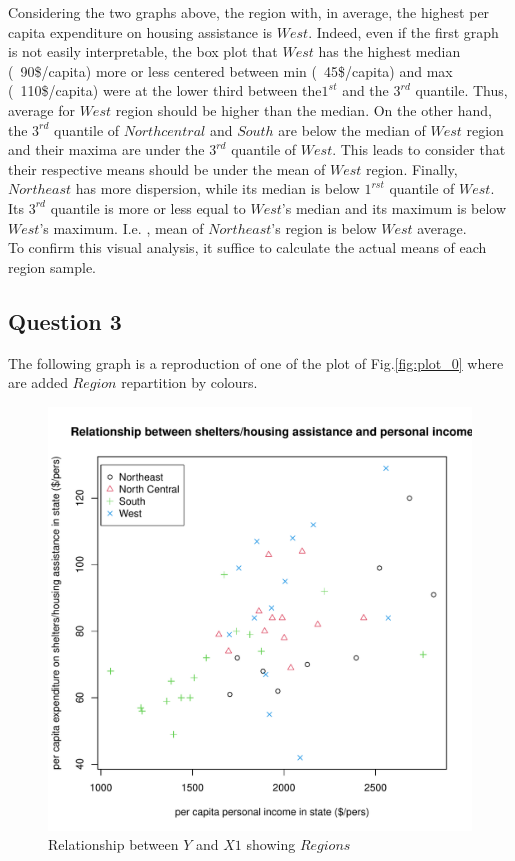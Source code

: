 \documentclass[12pt,letterpaper]{article}
\begin{document}
Considering the two graphs above, the region with, in average, the highest per capita expenditure on housing assistance is $West$. Indeed, even if the first graph is not easily interpretable, the box plot that $West$ has the highest median (~90\$/capita) more or less centered between min (~45\$/capita) and max (~110\$/capita) were at the lower third between  the$ 1^{st}$ and the $3^{rd}$ quantile. Thus, average for $West$ region should be higher than the median. On the other hand, the $3^{rd}$ quantile of $North central$  and $South$ are below the median of $West$ region and their maxima are under the $3^{rd}$ quantile of $West$. This leads to consider that their respective means should be under the mean of $West$ region. 
Finally, $Northeast$ has more dispersion, while its median is below $1^{rst}$ quantile of $West$. Its $3^{rd}$ quantile is more or less equal to $West$'s median and its maximum is below $West$'s maximum. I.e. ,  mean of $Northeast$'s region is below $West$ average.
\\
To confirm this visual analysis, it suffice to calculate the actual means of each region sample.

\subsection*{Question 3}

The following graph is a reproduction of one of the plot of  Fig.\ref{fig:plot_0} where are added $Region$ repartition by colours.

\begin{figure}[h!]\centering
	\caption{\footnotesize Relationship between $Y$ and $X1$ showing $Regions$ }
	\label{fig:plot_3}
	\includegraphics[width=.85\textwidth]{YX1Region.pdf}
\end{figure}
\end{document}
